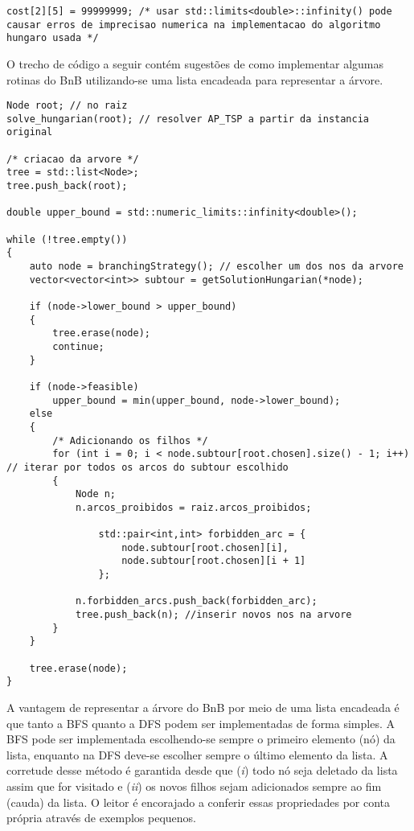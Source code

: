 {\begin{lstlisting}[style=cplusplusListStyle]
cost[2][5] = 99999999; /* usar std::limits<double>::infinity() pode causar erros de imprecisao numerica na implementacao do algoritmo hungaro usada */
\end{lstlisting}

O trecho de código a seguir contém sugestões de como implementar algumas rotinas do BnB utilizando-se uma lista encadeada para representar a árvore.     

\begin{lstlisting}[style=cplusplusListStyle]
Node root; // no raiz
solve_hungarian(root); // resolver AP_TSP a partir da instancia original

/* criacao da arvore */
tree = std::list<Node>;
tree.push_back(root);

double upper_bound = std::numeric_limits::infinity<double>();

while (!tree.empty())
{
	auto node = branchingStrategy(); // escolher um dos nos da arvore
	vector<vector<int>> subtour = getSolutionHungarian(*node);

	if (node->lower_bound > upper_bound)
	{
		tree.erase(node);
		continue;
	}

	if (node->feasible)
		upper_bound = min(upper_bound, node->lower_bound);
	else 
	{
		/* Adicionando os filhos */
		for (int i = 0; i < node.subtour[root.chosen].size() - 1; i++) // iterar por todos os arcos do subtour escolhido
		{
		    Node n;
		    n.arcos_proibidos = raiz.arcos_proibidos;
		        
				std::pair<int,int> forbidden_arc = {
					node.subtour[root.chosen][i],
					node.subtour[root.chosen][i + 1]
				};
		        
		    n.forbidden_arcs.push_back(forbidden_arc);
		    tree.push_back(n); //inserir novos nos na arvore
		}
	}

	tree.erase(node);
}
\end{lstlisting}

A vantagem de representar a árvore do BnB por meio de uma lista encadeada é que tanto a BFS quanto a DFS podem ser implementadas de forma simples. A BFS pode ser implementada escolhendo-se sempre o primeiro elemento (nó) da lista, enquanto na DFS deve-se escolher sempre o último elemento da lista. A corretude desse método é garantida desde que (\textit{i}) todo nó seja deletado da lista assim que for visitado e (\textit{ii}) os novos filhos sejam adicionados sempre ao fim (cauda) da lista. O leitor é encorajado a conferir essas propriedades por conta própria através de exemplos pequenos.  

}
